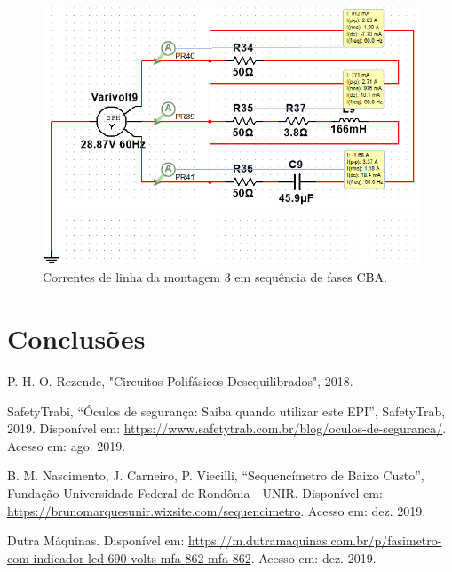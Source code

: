 \documentclass[a4paper,12pt,oneside,openany,table,xcdraw]{article}
\begin{document}
\begin{figure}[H]
\centering
\includegraphics[width=13.5cm]{m3-esquema-cba-correntes}
\caption{Correntes de linha da montagem 3 em sequência de fases CBA.}
\label{m2:IL}
\end{figure}


\newpage
\section{Conclusões} %

\newpage
\begin{thebibliography}{9} 
    P. H. O. Rezende,
    "Circuitos Polifásicos Desequilibrados", 2018.

    SafetyTrabi,
    “Óculos de segurança: Saiba quando utilizar este EPI”, SafetyTrab, 2019.
 Disponível em:
 \url{https://www.safetytrab.com.br/blog/oculos-de-seguranca/}. Acesso em: ago. 2019.

    B. M. Nascimento, J. Carneiro, P. Viecilli,
    “Sequencímetro de Baixo Custo”, Fundação Universidade Federal de Rondônia - UNIR.
 Disponível em:
 \url{https://brunomarquesunir.wixsite.com/sequencimetro}. Acesso em: dez. 2019.

    Dutra Máquinas.
 Disponível em:
 \url{https://m.dutramaquinas.com.br/p/fasimetro-com-indicador-led-690-volts-mfa-862-mfa-862}. Acesso em: dez. 2019.


\end{thebibliography}
\end{document}
